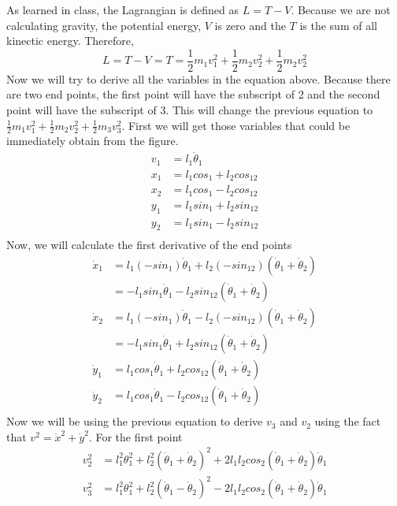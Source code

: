 As learned in class, the Lagrangian is defined as $L = T - V$. Because we are not calculating gravity, the potential energy, $V$ is zero and the $T$ is the sum of all kinectic energy. Therefore,
\begin{equation}
L = T - V = T = \frac{1}{2} m_1 v_1^2 + \frac{1}{2} m_2 v_2^2 + \frac{1}{2} m_2 v_2^2
\end{equation}
Now we will try to derive all the variables in the equation above. Because there are two end points, the first point will have the subscript of 2 and the second point will have the subscript of 3. This will change the previous equation to $\frac{1}{2} m_1 v_1^2 + \frac{1}{2} m_2 v_2^2 + \frac{1}{2} m_3 v_3^2$. First we will get those variables that could be immediately obtain from the figure.
\begin{equation}
\begin{aligned}
v_1 &= l_1 \dot{\theta}_1\\
x_1 &= l_1 cos_1 + l_2 cos_{12}\\
x_2 &= l_1 cos_1 - l_2 cos_{12}\\
y_1 &= l_1 sin_1 + l_2 sin_{12}\\
y_2 &= l_1 sin_1 - l_2 sin_{12}\\
\end{aligned}
\end{equation}
Now, we will calculate the first derivative of the end points
\begin{equation}
\begin{aligned}
\dot{x}_1 &= l_1(-sin_1)\dot{\theta}_1 + l_2(-sin_{12})(\dot{\theta}_1 + \dot{\theta}_2)\\
&= -l_1 sin_1 \dot{\theta}_1 - l_2 sin_{12}(\dot{\theta}_1 + \dot{\theta}_2)\\
\dot{x}_2 &= l_1(-sin_1)\dot{\theta}_1 - l_2(-sin_{12})(\dot{\theta}_1 + \dot{\theta}_2)\\
&= -l_1 sin_1 \dot{\theta}_1 + l_2 sin_{12}(\dot{\theta}_1 + \dot{\theta}_2)\\
\dot{y}_1 &= l_1 cos_1 \dot{\theta}_1 + l_2 cos_{12}(\dot{\theta}_1 + \dot{\theta}_2)\\
\dot{y}_2 &= l_1 cos_1 \dot{\theta}_1 - l_2 cos_{12}(\dot{\theta}_1 + \dot{\theta}_2)\\
\end{aligned}
\end{equation}
Now we will be using the previous equation to derive $v_3$ and $v_2$ using the fact that $v^2 = \dot{x}^2 + \dot{y}^2$. For the first point
\begin{equation}
\begin{aligned}
v_2^2 &= l_1^2\theta_1^2 + l_2^2(\dot{\theta}_1 + \dot{\theta}_2)^2 + 2 l_1 l_2 cos_2 (\dot{\theta}_1 + \dot{\theta}_2) \dot{\theta}_1\\
v_3^2 &= l_1^2\theta_1^2 + l_2^2(\dot{\theta}_1 - \dot{\theta}_2)^2 - 2 l_1 l_2 cos_2 (\dot{\theta}_1 + \dot{\theta}_2) \dot{\theta}_1\\
\end{aligned}
\end{equation}
